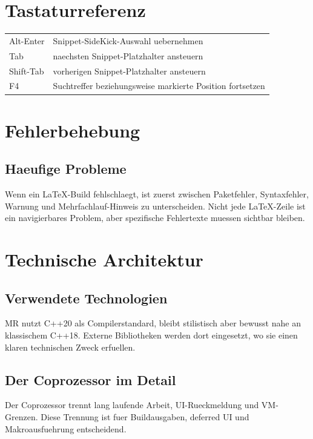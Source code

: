 \documentclass[a4paper,11pt]{report}
\newcommand{\mr}{\textsc{MR}}
\begin{document}
\chapter{Tastaturreferenz}

\begin{longtable}{>{\ttfamily}p{}p{}}
Alt-Enter & Snippet-SideKick-Auswahl uebernehmen\\
Tab & naechsten Snippet-Platzhalter ansteuern\\
Shift-Tab & vorherigen Snippet-Platzhalter ansteuern\\
F4 & Suchtreffer beziehungsweise markierte Position fortsetzen\\
\end{longtable}

\chapter{Fehlerbehebung}

\section{Haeufige Probleme}

Wenn ein LaTeX-Build fehlschlaegt, ist zuerst zwischen Paketfehler,
Syntaxfehler, Warnung und Mehrfachlauf-Hinweis zu unterscheiden. Nicht jede
LaTeX-Zeile ist ein navigierbares Problem, aber spezifische Fehlertexte muessen
sichtbar bleiben.

\chapter{Technische Architektur}

\section{Verwendete Technologien}

\mr{} nutzt C++20 als Compilerstandard, bleibt stilistisch aber bewusst nahe an
klassischem C++18. Externe Bibliotheken werden dort eingesetzt, wo sie einen
klaren technischen Zweck erfuellen.

\section{Der Coprozessor im Detail}

Der Coprozessor trennt lang laufende Arbeit, UI-Rueckmeldung und VM-Grenzen.
Diese Trennung ist fuer Buildausgaben, deferred UI und Makroausfuehrung
entscheidend.
\end{document}
